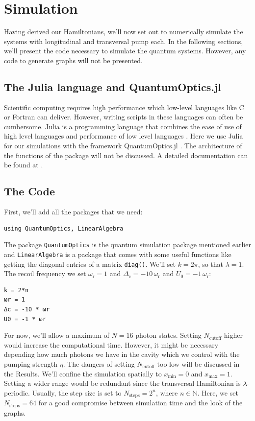 \section{Simulation}
Having derived our Hamiltonians, we'll now set out to numerically simulate the systems with longitudinal and transversal pump each. In the following sections, we'll present the code necessary to simulate the quantum systems. However, any code to generate graphs will not be presented.

\subsection{The Julia language and QuantumOptics.jl}
Scientific computing requires high performance which low-level languages like C or Fortran can deliver. However, writing scripts in these languages can often be cumbersome. Julia is a programming language that combines the ease of use of high level languages and performance of low level languages \cite{julialang}. Here we use Julia for our simulations with the framework QuantumOptics.jl \cite{qojulia}. The architecture of the functions of the package will not be discussed. A detailed documentation can be found at \cite{documentation}.

\subsection{The Code}
First, we'll add all the packages that we need:

\begin{lstlisting}
using QuantumOptics, LinearAlgebra
\end{lstlisting}The package \texttt{QuantumOptics} is the quantum simulation package mentioned earlier and \texttt{LinearAlgebra} is a package that comes with some useful functions like getting the diagonal entries of a matrix \texttt{diag()}. We'll set $k=2\pi$, so that $\lambda=1$. The recoil frequency we set $\omega_\text{r} = 1$ and $\Delta_\text{c} = -10 \, \omega_\text{r}$ and $U_0 = -1 \, \omega_\text{r}$:

\begin{lstlisting}
k = 2*π
ωr = 1
Δc = -10 * ωr
U0 = -1 * ωr
\end{lstlisting}For now, we'll allow a maximum of $N = 16$ photon states. Setting $N_\text{cutoff}$ higher would increase the computational time. However, it might be necessary depending how much photons we have in the cavity which we control with the pumping strength $\eta$. The dangers of setting $N_\text{cutoff}$ too low will be discussed in the Results. We'll confine the simulation spatially to $x_\text{min} = 0$ and $x_\text{max} = 1$. Setting a wider range would be redundant since the transversal Hamiltonian is $\lambda$-periodic. Usually, the step size is set to $N_\text{steps} = 2^n$, where $n \in \mathbb{N}$. Here, we set $N_\text{steps} = 64$ for a good compromise between simulation time and the look of the graphs.

